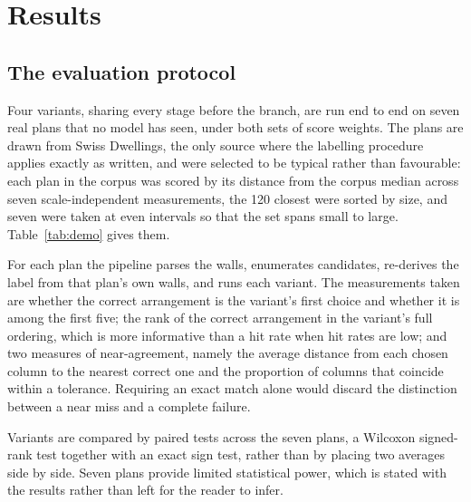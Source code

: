 \chapter{Results}
\label{ch:results}

\section{The evaluation protocol}

Four variants, sharing every stage before the branch, are run end to end on
seven real plans that no model has seen, under both sets of score weights.
The plans are drawn from Swiss Dwellings, the only source where the
labelling procedure applies exactly as written, and were selected to be
typical rather than favourable: each plan in the corpus was scored by its
distance from the corpus median across seven scale-independent
measurements, the 120 closest were sorted by size, and seven were taken at
even intervals so that the set spans small to large.
Table~\ref{tab:demo} gives them.

\begin{table}[H]
\centering
\caption[The seven evaluation plans]{The seven evaluation plans. Marked
columns are those the original drawing recorded, which the generator
retains in every candidate. The final column is the rank the derived
arrangement receives from the baseline variant under learned weights.}
\label{tab:demo}
\small

\end{table}

For each plan the pipeline parses the walls, enumerates candidates,
re-derives the label from that plan's own walls, and runs each variant. The
measurements taken are whether the correct arrangement is the variant's
first choice and whether it is among the first five; the rank of the
correct arrangement in the variant's full ordering, which is more
informative than a hit rate when hit rates are low; and two measures of
near-agreement, namely the average distance from each chosen column to the
nearest correct one and the proportion of columns that coincide within a
tolerance. Requiring an exact match alone would discard the distinction
between a near miss and a complete failure.

Variants are compared by paired tests across the seven plans, a Wilcoxon
signed-rank test together with an exact sign test, rather than by placing
two averages side by side. Seven plans provide limited statistical power,
which is stated with the results rather than left for the reader to infer.

